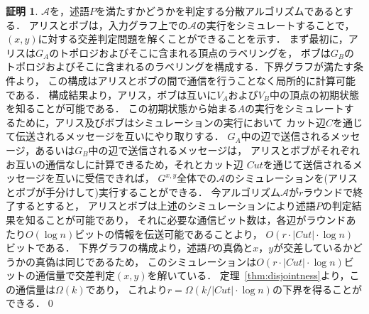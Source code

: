 \documentclass[11pt,a4paper]{jarticle}
\theoremstyle{definition}
\newtheorem*{prf*}{証明}
\begin{document}
\begin{prf*}
$\mathcal{A}$を，述語$P$を満たすかどうかを判定する分散アルゴリズムであるとする．
アリスとボブは，入力グラフ上での$\mathcal{A}$の実行をシミュレートすることで，
$(x, y)$に対する交差判定問題を解くことができることを示す．
まず最初に，アリスは$G_{A}$のトポロジおよびそこに含まれる頂点のラベリングを，
ボブは$G_{B}$のトポロジおよびそこに含まれるのラベリングを構成する．下界グラフが満たす条件より，
この構成はアリスとボブの間で通信を行うことなく局所的に計算可能である．
構成結果より，アリス，ボブは互いに$V_A$および$V_B$中の頂点の初期状態を知ることが可能である．
この初期状態から始まる$A$の実行をシミュレートするために，アリス及びボブはシミュレーションの実行において
カット辺$C$を通じて伝送されるメッセージを互いにやり取りする．
$G_{A}$中の辺で送信されるメッセージ，あるいは$G_{B}$中の辺で送信されるメッセージは，
アリスとボブがそれぞれお互いの通信なしに計算できるため，それとカット辺
$\mathit{Cut}$を通じて送信されるメッセージを互いに受信できれば，
$G^{x,y}$全体での$\mathcal{A}$のシミュレーションを(アリスとボブが手分けして)実行することができる．
今アルゴリズム$\mathcal{A}$が$r$ラウンドで終了するとすると，
アリスとボブは上述のシミュレーションにより述語$P$の判定結果を知ることが可能であり，
それに必要な通信ビット数は，各辺がラウンドあたり$O(\log n)$ビットの情報を伝送可能であることより，
$O(r \cdot |\mathit{Cut}| \cdot \log n)$ビットである．
下界グラフの構成より，述語$P$の真偽と$x$，$y$が交差しているかどうかの真偽は同じであるため，
このシミュレーションは$O(r \cdot |\mathit{Cut}| \cdot \log n)$ビットの通信量で交差判定$(x,y)$を解いている．
定理~\ref{thm:disjointness}より，この通信量は$\Omega(k)$であり，
これより$r = \Omega (k / |\mathit{Cut}| \cdot \log n)$の下界を得ることができる．\qed
\end{prf*}
\newpage
\end{document}
